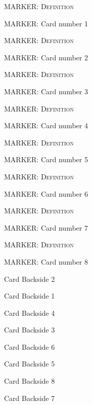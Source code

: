 \documentclass[a4paper]{article}
\begin{document}
{
	\noindent \textsc{
		MARKER: Definition
	}
	\vfill
	\centerline{{\Large 
		MARKER: Card number 1
	}}
	\vfill
}
\newpage

{
	\noindent \textsc{
		MARKER: Definition
	}
	\vfill
	\centerline{{\Large 
		MARKER: Card number 2
	}}
	\vfill
}
\newpage

{
	\noindent \textsc{
		MARKER: Definition
	}
	\vfill
	\centerline{{\Large 
		MARKER: Card number 3
	}}
	\vfill
}
\newpage

{
	\noindent \textsc{
		MARKER: Definition
	}
	\vfill
	\centerline{{\Large 
		MARKER: Card number 4
	}}
	\vfill
}
\newpage

{
	\noindent \textsc{
		MARKER: Definition
	}
	\vfill
	\centerline{{\Large 
		MARKER: Card number 5
	}}
	\vfill
}
\newpage

{
	\noindent \textsc{
		MARKER: Definition
	}
	\vfill
	\centerline{{\Large 
		MARKER: Card number 6
	}}
	\vfill
}
\newpage

{
	\noindent \textsc{
		MARKER: Definition
	}
	\vfill
	\centerline{{\Large 
		MARKER: Card number 7
	}}
	\vfill
}
\newpage

{
	\noindent \textsc{
		MARKER: Definition
	}
	\vfill
	\centerline{{\Large 
		MARKER: Card number 8
	}}
	\vfill
}
\newpage

{
	\centerline{{\Large 
		Card Backside 2
	}}
}
\newpage

{
	\centerline{{\Large 
		Card Backside 1
	}}
}
\newpage

{
	\centerline{{\Large 
		Card Backside 4
	}}
}
\newpage

{
	\centerline{{\Large 
		Card Backside 3
	}}
}
\newpage

{
	\centerline{{\Large 
		Card Backside 6
	}}
}
\newpage

{
	\centerline{{\Large 
		Card Backside 5
	}}
}
\newpage

{
	\centerline{{\Large 
		Card Backside 8
	}}
}
\newpage

{
	\centerline{{\Large 
		Card Backside 7
	}}
}
\newpage
\end{document}
